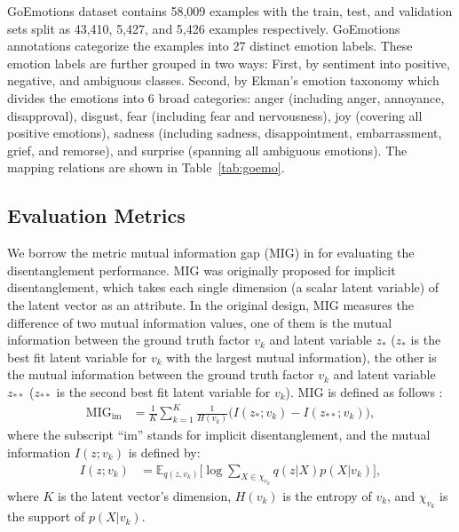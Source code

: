 \documentclass[11pt,a4paper]{article}
\renewcommand{\cite}{\citep}
\begin{document}
GoEmotions dataset contains 58,009 examples with the train, test, and validation sets split as 43,410, 5,427, and 5,426 examples respectively. GoEmotions annotations categorize the examples into 27 distinct emotion labels. These emotion labels are further grouped in two ways:
First, by sentiment into positive, negative, and ambiguous classes.
Second, by Ekman's emotion taxonomy which divides the emotions into 6 broad categories: anger (including anger, annoyance, disapproval), disgust, fear (including fear and nervousness), joy (covering all positive emotions), sadness (including sadness, disappointment, embarrassment, grief, and remorse), and surprise (spanning all ambiguous emotions). The mapping relations are shown in Table~\ref{tab:goemo}.



\subsection{Evaluation Metrics}


We borrow the metric mutual information gap (MIG) in \cite{chen2018isolating} for evaluating the disentanglement performance. MIG was originally proposed for implicit disentanglement, which takes each single dimension (a scalar latent variable) of the latent vector as an attribute. In the original design, MIG measures the difference of two mutual information values, one of them is the mutual information between  the
ground truth factor $v_k$ and   latent variable $z_\ast$  ($z_\ast$ is the best fit latent variable for $v_k$ with  the largest mutual information), the other is the mutual information between  the
ground truth factor $v_k$ and   latent variable $z_{\ast\ast}$ ($z_{\ast\ast}$ is the second best fit latent variable for $v_k$). 
MIG is defined as follows %
\cite{chen2018isolating}: 
\begin{align}
    \text{MIG}_\text{im}&=\frac{1}{K}\sum_{k=1}^K\frac{1}{H(v_k)}\Big(I(z_\ast;v_k)-I(z_{\ast\ast};v_k)\Big), \label{eq:mig_implicit}
 \end{align}   
 where the subscript ``im'' stands for implicit disentanglement, and the mutual information $I(z;v_k)$ is defined by:
 \begin{align}
    I(z;v_k) &= \mathbb E_{q(z,v_k)}\Big[\log\!\sum_{X\in\chi_{v_k}}\!\!\!q(z|X)p(X|v_k)\Big],
\end{align}
where $K$ is the  latent vector's dimension, $H(v_k)$ is the entropy of $v_k$, and $\chi_{v_k}$ is the support of $p(X|v_k)$.
\end{document}
